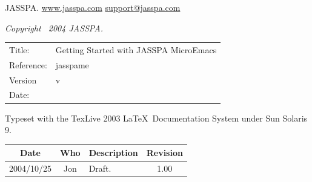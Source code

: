 \documentclass[11pt,a4paper,pdftex]{article}
\newcommand{\docTitle}{Getting Started with JASSPA MicroEmacs}
\newcommand{\docDate}{\CVSDate}
\newcommand{\docVersion}{\CVSRevision}
\newcommand{\docReference}{jasspame}
\newcommand{\tableTitle}[1]{\textbf{#1}}%
\begin{document}
\newpage
\setlength{\parindent}{0pt}
\setlength{\parskip}{0.5ex}
\pagestyle{fancy}

\begin{small}
\vspace{.5in}
JASSPA.
\href{http://www.jasspa.com}{www.jasspa.com}\newline
\href{mailto:support@jasspa.com}{support@jasspa.com}\newline

\vspace{0.5in}

\textit{Copyright \textcopyright\ 2004 JASSPA.}


\vspace{0.5in}

\begin{table}[ht]
  \begin{tabular}{ll}
    Title:        & \docTitle \\
    Reference:    & \docReference \\
    Version       & v\docVersion \\
    Date:         & \docDate \\
  \end{tabular}
\end{table}

Typeset with the TexLive 2003 \LaTeX\ Documentation System under Sun Solaris 9.

\vspace{0.5in}

\begin{center}
  \begin{table}[ht]
    \begin{tabular}{|c|c|p{4in}|c|}
    \hline
    \tableTitle{Date} & \tableTitle{Who} & \tableTitle{Description} & \tableTitle{Revision} \\
    \hline
    2004/10/25 & Jon & Draft. & 1.00 \\ \hline
    \end{tabular}
  \end{table}
\end{center}
\end{small}
\end{document}
